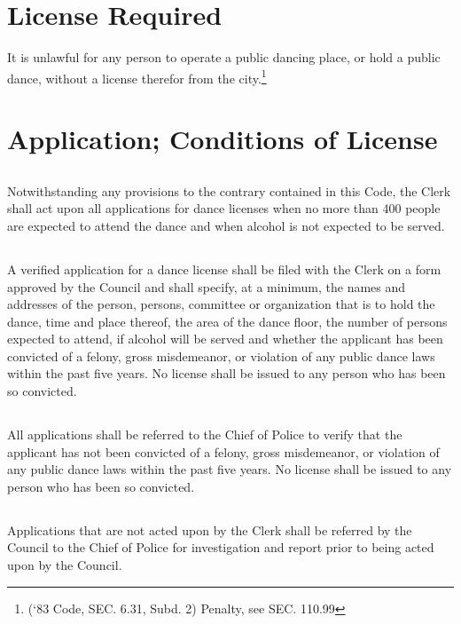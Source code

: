 \section{License Required}
It is unlawful for any person to operate a public dancing place, or hold a public dance, without a license therefor from the city.\footnote{(‘83 Code, SEC. 6.31, Subd. 2)  Penalty, see SEC. 110.99}

\section{Application; Conditions of License}
\subsection{}
Notwithstanding any provisions to the contrary contained in this Code, the Clerk shall act upon all applications for dance licenses when no more than 400 people are expected to attend the dance and when alcohol is not expected to be served.
\subsection{}
A verified application for a dance license shall be filed with the Clerk on a form approved by the Council and shall specify, at a minimum, the names and addresses of the person, persons, committee or organization that is to hold the dance, time and place thereof, the area of the dance floor, the number of persons expected to attend, if alcohol will be served and whether the applicant has been convicted of a felony, gross misdemeanor, or violation of any public dance laws within the past five years.  No license shall be issued to any person who has been so convicted.
\subsection{}
All applications shall be referred to the Chief of Police to verify that the applicant has not been convicted of a felony, gross misdemeanor, or violation of any public dance laws within the past five years.  No license shall be issued to any person who has been so convicted.
\subsection{}
Applications that are not acted upon by the Clerk shall be referred by the Council to the Chief of Police for investigation and report prior to being acted upon by the Council.
